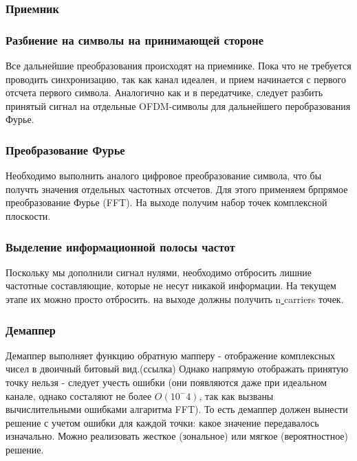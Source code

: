 \subsubsection{Приемник}

 \subsubsection*{Разбиение на символы на принимающей стороне}
 Все дальнейшие преобразования происходят на приемнике.
 Пока что не требуется проводить синхронизацию, так как канал идеален, и прием начинается с первого отсчета первого символа. 
 Аналогично как и в передатчике, следует разбить принятый сигнал на отдельные OFDM-символы для дальнейшего перобразования Фурье. 
 
\subsubsection*{Преобразование Фурье}
Необходимо выполнить аналого цифровое преобразование символа,  что бы получть значения отдельных частотных отсчетов.
Для этого применяем брпрямое преобразование Фурье (FFT).
На выходе получим набор точек комплексной плоскости.

\subsubsection*{Выделение информационной полосы частот}
Поскольку мы дополнили сигнал нулями, необходимо отбросить лишние частотные составляющие, которые не несут никакой информации. 
На  текущем этапе их можно просто отбросить.
на выходе должны получить  n\underline{ }carriers точек.  

\subsubsection*{Демаппер} 

Демаппер выполняет функцию обратную мапперу - отображение комплексных чисел в двоичный битовый вид.(ссылка) 
Однако напрямую отображать принятую точку нельзя - следует учесть ошибки (они появляются даже при идеальном канале, однако состаляют не более $O(10^-4)$, так как вызваны вычислительными ошибками алгаритма FFT). 
То есть демаппер должен вынести решение с учетом ошибки для каждой точки: какое значение передавалось изначально. 
Можно реализовать жесткое (зональное) или мягкое (вероятностное) решение. 

